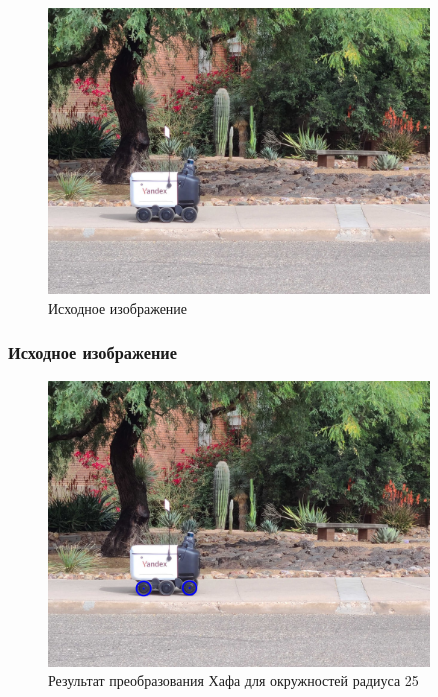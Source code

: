 \begin{figure}[H]
    \centering
    \includegraphics[width=0.9\textwidth]{../source/7.png}
    \caption{Исходное изображение}
\end{figure}

\subsubsection{Исходное изображение}


\begin{figure}[H]
    \centering
    \includegraphics[width=0.9\textwidth]{../outputs/image7_ordinary_r25.png}
    \caption{Результат преобразования Хафа для окружностей радиуса 25}
\end{figure}

